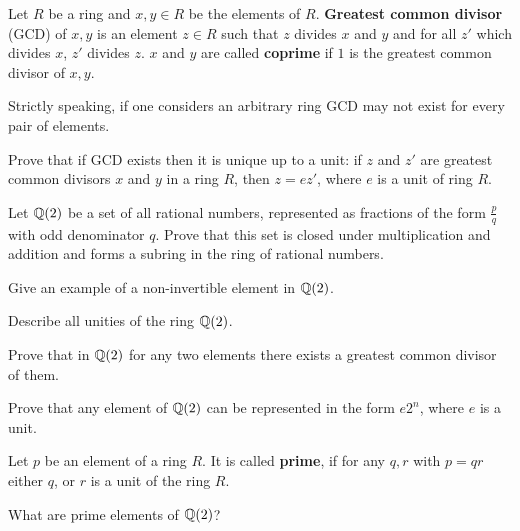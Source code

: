 \documentclass[12pt]{article}
\begin{document}
\begin{opredelenie} 
Let $R$ be a ring and $x, y\in R$ be the elements of $R$. {\bf
Greatest common divisor} (GCD) of $x, y$ is an element $z\in R$ such
that $z$ divides $x$ and $y$ and for all $z'$ which divides $x$, $z'$
divides $z$. $x$ and $y$ are called {\bf coprime} if $1$ is the
greatest common divisor of $x,y$.
\end{opredelenie}

Strictly speaking, if one considers an arbitrary ring GCD may not
exist for every pair of elements.

\begin{zadacha}
Prove that if GCD exists then it is unique up to a unit: if $z$ and
$z'$ are greatest common divisors $x$ and $y$ in a ring $R$, then $z =
e z'$, where $e$ is a unit of ring $R$.
\end{zadacha}

\begin{zadacha} Let ${\mathbb Q}(2)$ be a set of all rational numbers,
represented as fractions of the form $\frac p q$ with odd denominator
$q$. Prove that this set is closed under multiplication and addition
and forms a subring in the ring of rational numbers.
\end{zadacha}

\begin{zadacha} Give an example of a non-invertible element in ${\mathbb Q}(2)$.
\end{zadacha}

\begin{zadacha} Describe all unities of the ring ${\mathbb Q}(2)$.
\end{zadacha}

\begin{zadacha}[!] Prove that in ${\mathbb Q}(2)$ for any two elements there
 exists a greatest common divisor of them.\end{zadacha}

\begin{ukazanie} Prove that any element of ${\mathbb Q}(2)$ can be represented
  in the form $e 2^n$, where $e$ is a unit.
\end{ukazanie}

\begin{opredelenie} Let $p$ be an element of a ring $R$. It is called 
{\bf prime}, if for any $q,r$ with $p=qr$ either $q$, or $r$ is a
unit of the ring $R$.
\end{opredelenie}

\begin{zadacha} What are prime elements of ${\mathbb Q}(2)$?
\end{zadacha}
\end{document}
